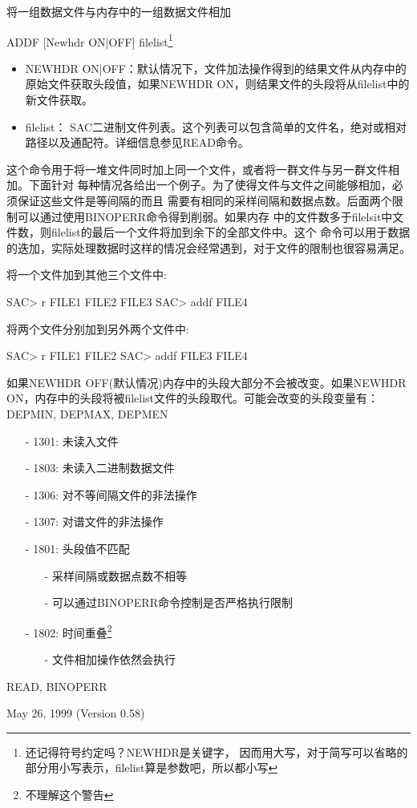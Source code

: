 \label{cmd:addf}

将一组数据文件与内存中的一组数据文件相加

ADDF [Newhdr ON|OFF] filelist\footnote{还记得符号约定吗？NEWHDR是关键字，
因而用大写，对于简写可以省略的部分用小写表示，filelist算是参数吧，所以都小写}

\begin{itemize}
\item NEWHDR ON|OFF：默认情况下，文件加法操作得到的结果文件从内存中的原始文件获取头段值，如果NEWHDR ON，则结果文件的头段将从filelist中的新文件获取。
\item filelist： SAC二进制文件列表。这个列表可以包含简单的文件名，绝对或相对路径以及通配符。详细信息参见READ命令。
\end{itemize}

这个命令用于将一堆文件同时加上同一个文件，或者将一群文件与另一群文件相加。下面针对
每种情况各给出一个例子。为了使得文件与文件之间能够相加，必须保证这些文件是等间隔的而且
需要有相同的采样间隔和数据点数。后面两个限制可以通过使用BINOPERR命令得到削弱。如果内存
中的文件数多于filelsit中文件数，则filelist的最后一个文件将加到余下的全部文件中。这个
命令可以用于数据的迭加，实际处理数据时这样的情况会经常遇到，对于文件的限制也很容易满足。

将一个文件加到其他三个文件中:
\begin{SACCode}
SAC> r FILE1 FILE2 FILE3
SAC> addf FILE4
\end{SACCode}
将两个文件分别加到另外两个文件中:
\begin{SACCode}
SAC> r FILE1 FILE2
SAC> addf FILE3 FILE4
\end{SACCode}

如果NEWHDR OFF(默认情况)内存中的头段大部分不会被改变。如果NEWHDR ON，内存中的头段将被filelist文件的头段取代。可能会改变的头段变量有：DEPMIN, DEPMAX, DEPMEN

\begin{itemize}
\item[-]1301: 未读入文件
\item[-]1803: 未读入二进制数据文件
\item[-]1306: 对不等间隔文件的非法操作
\item[-]1307: 对谱文件的非法操作
\item[-]1801: 头段值不匹配
	\begin{itemize}
	\item[-]采样间隔或数据点数不相等
	\item[-]可以通过BINOPERR命令控制是否严格执行限制
	\end{itemize}
\end{itemize}




\begin{itemize}
\item[-]1802: 时间重叠\footnote{不理解这个警告}
	\begin{itemize}
  	\item[-]文件相加操作依然会执行
	\end{itemize}
\end{itemize}

READ, BINOPERR

May 26, 1999 (Version 0.58)
